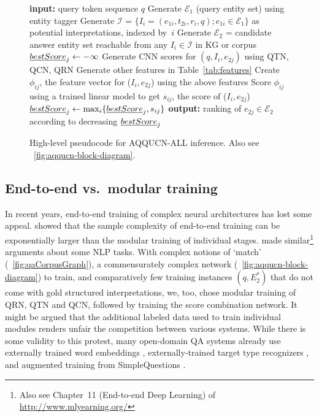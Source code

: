 \documentclass{svjour3}
\begin{document}
\begin{figure}[t]
\begin{boxedminipage}{\hsize}
\begin{algorithmic}[1]  \raggedright
\STATE \textbf{input:} query token sequence $q$
\STATE Generate $\mathcal{E}_1$ (query entity set) using entity tagger
\STATE Generate $\mathcal{I}$ = $\{{I}_i = (e_{1i}, t_{2i}, r_i, q) ; e_{1i} \in \mathcal{E}_1 \}$ as potential interpretations, indexed by~$i$
\STATE Generate $\mathcal{E}_2$ = candidate answer entity set reachable from any ${I}_i \in \mathcal{I}$ in KG or corpus
  \STATE $\emph{bestScore}_j \leftarrow -\infty$
    \STATE Generate CNN scores for  $(q, {I}_i, e_{2j})$ using QTN, QCN, QRN
    \STATE Generate other features in Table~\ref{tab:features}
    \STATE Create $\phi_{ij}$, the feature vector for (${I}_i, e_{2j}$) using the above features
    \STATE Score $\phi_{ij}$ using a trained linear model to get $s_{ij}$, the score of (${I}_i, e_{2j}$)
    \STATE $\emph{bestScore}_j \leftarrow \max_i\{ \emph{bestScore}_j, s_{ij} \}$
  \ENDFOR
\ENDFOR
\STATE \textbf{output:} ranking of $e_{2j} \in \mathcal{E}_2$ according to decreasing $\emph{bestScore}_j$
\end{algorithmic}
\end{boxedminipage}
  \caption{High-level pseudocode for AQQUCN-ALL inference.
 Also see \figurename~\ref{fig:aqqucn-block-diagram}.}
  \label{fig:qiAlgo}
\end{figure}



\subsection{End-to-end vs.\ modular training}

In recent years, end-to-end training of complex neural architectures has lost some appeal.  \citet{ShalevshwartzS2016} showed that the sample complexity of end-to-end training can be exponentially larger than the modular training of individual stages.  \citet{Roth2017IjcaiMccarthy} made similar\footnote{Also see Chapter~11 (End-to-end Deep Learning) of \protect\url{http://www.mlyearning.org/}} arguments about some NLP tasks.  With complex notions of `match' (\figurename~\ref{fig:qaCorpusGraph}), a commensurately complex network (\figurename~\ref{fig:aqqucn-block-diagram}) to train, and comparatively few training instances $(q, E_2^*)$ that do not come with gold structured interpretations, we, too, chose modular training of QRN, QTN and QCN, followed by training the score combination network.  It might be argued that the additional labeled data used to train individual modules renders unfair the competition between various systems.  While there is some validity to this protest, many open-domain QA systems already use externally trained word embeddings \citep{BastH2015aqqu, YihCHG2015STAGG, XuRFHZ2016FbCorpusQA}, externally-trained target type recognizers \citep{MurdockKWFFGZK2012TypeCoercion, YavuzGSSY2016AnswerTypeInference}, and augmented training from SimpleQuestions \citep{BordesUCW2015MemNetQA}.
\end{document}

